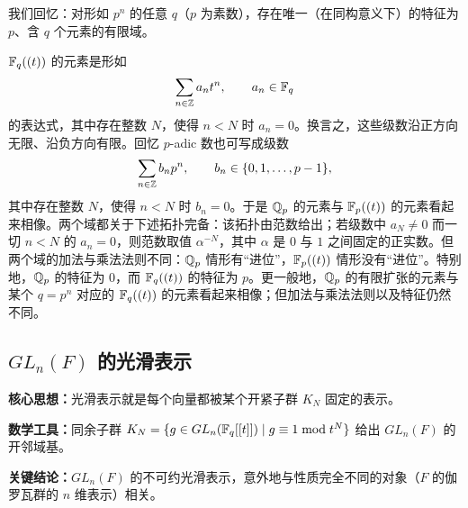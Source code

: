 我们回忆：对形如 $p^n$ 的任意 $q$（$p$ 为素数），存在唯一（在同构意义下）的特征为 $p$、含 $q$ 个元素的有限域。


$\mathbb{F}_q((t))$ 的元素是形如
\[
    \sum_{n\in\mathbb{Z}} a_n t^n,\qquad a_n\in\mathbb{F}_q
\]
的表达式，其中存在整数 $N$，使得 $n<N$ 时 $a_n=0$。换言之，这些级数沿正方向无限、沿负方向有限。回忆 $p$-adic 数也可写成级数
\[
    \sum_{n\in\mathbb{Z}} b_n p^n,\qquad b_n\in\{0,1,\dots,p-1\},
\]
其中存在整数 $N$，使得 $n<N$ 时 $b_n=0$。于是 $\mathbb{Q}_p$ 的元素与 $\mathbb{F}_p((t))$ 的元素看起来相像。两个域都关于下述拓扑完备：该拓扑由范数给出；若级数中 $a_N\neq 0$ 而一切 $n<N$ 的 $a_n=0$，则范数取值 $\alpha^{-N}$，其中 $\alpha$ 是 $0$ 与 $1$ 之间固定的正实数。但两个域的加法与乘法法则不同：$\mathbb{Q}_p$ 情形有“进位”，$\mathbb{F}_p((t))$ 情形没有“进位”。特别地，$\mathbb{Q}_p$ 的特征为 $0$，而 $\mathbb{F}_q((t))$ 的特征为 $p$。更一般地，$\mathbb{Q}_p$ 的有限扩张的元素与某个 $q=p^n$ 对应的 $\mathbb{F}_q((t))$ 的元素看起来相像；但加法与乘法法则以及特征仍然不同。


\subsection{$GL_n(F)$ 的光滑表示}

\begin{keypoints}
    \item \textbf{核心思想：}光滑表示就是每个向量都被某个开紧子群 $K_N$ 固定的表示。
    \item \textbf{数学工具：}同余子群 $K_N=\{g\in GL_n(\mathbb{F}_q[[t]])\mid g\equiv 1\bmod t^N\}$ 给出 $GL_n(F)$ 的开邻域基。
    \item \textbf{关键结论：}$GL_n(F)$ 的不可约光滑表示，意外地与性质完全不同的对象（$F$ 的伽罗瓦群的 $n$ 维表示）相关。
\end{keypoints}

